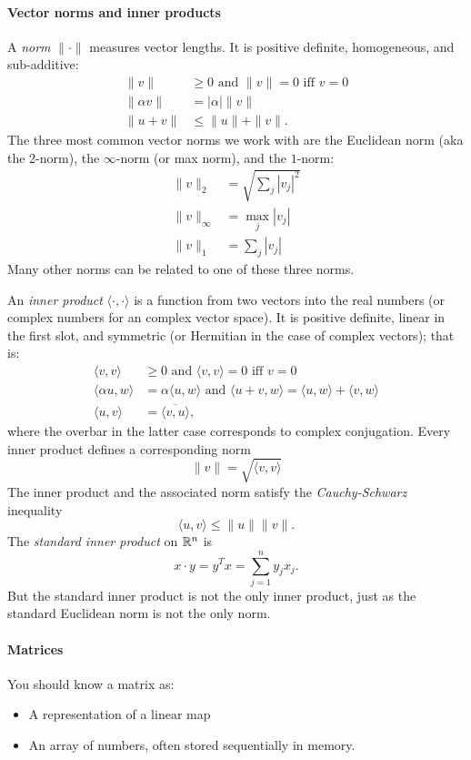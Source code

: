 \documentclass[12pt, leqno]{article}
\begin{document}
\paragraph{Vector norms and inner products}
A {\em norm} $\|\cdot\|$ measures vector lengths.  It is
positive definite, homogeneous, and sub-additive:
\begin{align*}
  \|v\| & \geq 0 \mbox{ and } \|v\| = 0 \mbox{ iff } v = 0 \\
  \|\alpha v\| &= |\alpha| \|v\| \\
  \|u+v\| & \leq \|u\| + \|v\|.
\end{align*}
The three most common vector norms we work with are the
Euclidean norm (aka the 2-norm), the $\infty$-norm (or max norm),
and the $1$-norm:
\begin{align*}
  \|v\|_2 &= \sqrt{\sum_j |v_j|^2} \\
  \|v\|_\infty &= \max_j |v_j| \\
  \|v\|_1 &= \sum_j |v_j|
\end{align*}
Many other norms can be related to one of these three norms.

An {\em inner product} $\langle \cdot, \cdot \rangle$
is a function from two vectors into the real
numbers (or complex numbers for an complex vector space).  It is
positive definite, linear in the first slot, and symmetric (or
Hermitian in the case of complex vectors); that is:
\begin{align*}
  \langle v, v \rangle & \geq 0 \mbox{ and }
  \langle v, v \rangle = 0 \mbox{ iff } v = 0 \\
%
  \langle \alpha u, w \rangle &= \alpha \langle u, w \rangle
  \mbox{ and }
  \langle u+v, w \rangle = \langle u, w \rangle + \langle v, w \rangle \\
%
  \langle u, v \rangle &= \overline{\langle v, u \rangle},
\end{align*}
where the overbar in the latter case corresponds to complex
conjugation.  Every inner product defines a corresponding norm
\[
  \|v\| = \sqrt{ \langle v, v \rangle}
\]
The inner product and the associated norm satisfy
the {\em Cauchy-Schwarz} inequality
\[
  \langle u, v \rangle \leq \|u\| \|v\|.
\]
The {\em standard inner product} on $\mathbb{R}^n$ is
\[
  x \cdot y = y^T x = \sum_{j=1}^n y_j x_j.
\]
But the standard inner product is not the only inner product,
just as the standard Euclidean norm is not the only norm.

\paragraph{Matrices}
You should know a matrix as:
\begin{itemize}
\item A representation of a linear map
\item An array of numbers, often stored sequentially in memory.
\end{itemize}
\end{document}

